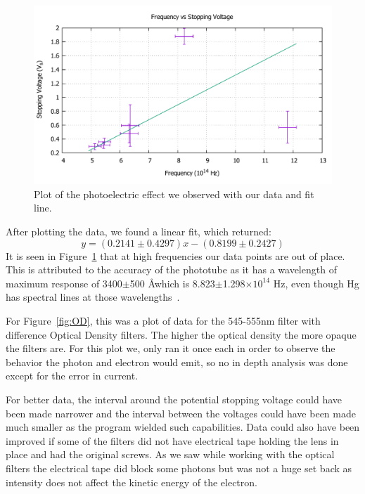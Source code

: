 \documentclass[11pt,letterpaper,onecolumn]{article}
\begin{document}
\begin{figure}[H]
 \begin{center}
 \includegraphics*[scale = .6]{VtoF.pdf}
 \caption{Plot of the photoelectric effect we observed with our data and fit line.~\label{fig:results} }
 \end{center}
\end{figure}

After plotting the data, we found a linear fit, which returned:
$$y = (0.2141\pm0.4297) x - (0.8199\pm0.2427)$$
It is seen in Figure~\ref{fig:results} that at high frequencies our data points are out of place. This is attributed to the accuracy of the phototube as it has a wavelength of maximum response of 3400$\pm$500 \AA which is 8.823$\pm$1.298$\times10^{14}$ Hz, even though Hg has spectral lines at those wavelengths~\cite{Hof}.

For Figure~\ref{fig:OD}, this was a plot of data for the 545-555nm filter with difference Optical Density filters. The higher the optical density the more opaque the filters are. For this plot we, only ran it once each in order to observe the behavior the photon and electron would emit, so no in depth analysis was done except for the error in current. 

For better data, the interval around the potential stopping voltage could have been made narrower and the interval between the voltages could have been made much smaller as the program wielded such capabilities. Data could also have been improved if some of the filters did not have electrical tape holding the lens in place and had the original screws. As we saw while working with the optical filters the electrical tape did block some photons but was not a huge set back as intensity does not affect the kinetic energy of the electron. 
\end{document}
